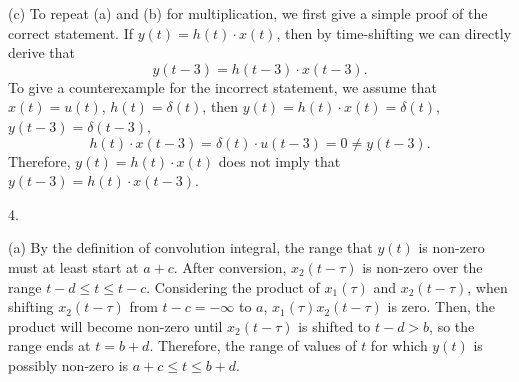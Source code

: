 \documentclass[a4paper]{article}
\begin{document}
(c) To repeat (a) and (b) for multiplication, we first give a simple proof of the correct statement. If $y(t)=h(t)\cdot x(t)$, then by time-shifting we can directly derive that
$$y(t-3)=h(t-3)\cdot x(t-3).$$
To give a counterexample for the incorrect statement, we assume that $x(t)=u(t)$, $h(t)=\delta(t)$, then $y(t)=h(t)\cdot x(t)=\delta(t)$, $y(t-3)=\delta(t-3)$,
$$h(t)\cdot x(t-3)=\delta(t)\cdot u(t-3)=0\neq y(t-3).$$
Therefore, $y(t)=h(t)\cdot x(t)$ does not imply that $y(t-3)=h(t)\cdot x(t-3)$.

4.

(a) By the definition of convolution integral, the range that $y(t)$ is non-zero must at least start at $a+c$. After conversion, $x_2(t-\tau)$ is non-zero over the range $t-d\leq t\leq t-c$. Considering the product of $x_1(\tau)$ and $x_2(t-\tau)$, when shifting $x_2(t-\tau)$ from $t-c=-\infty$ to $a$, $x_1(\tau)x_2(t-\tau)$ is zero. Then, the product will become non-zero until $x_2(t-\tau)$ is shifted to $t-d>b$, so the range ends at $t=b+d$. Therefore, the range of values of $t$ for which $y(t)$ is possibly non-zero is $\boxed{a+c\leq t\leq b+d}$.
\end{document}
